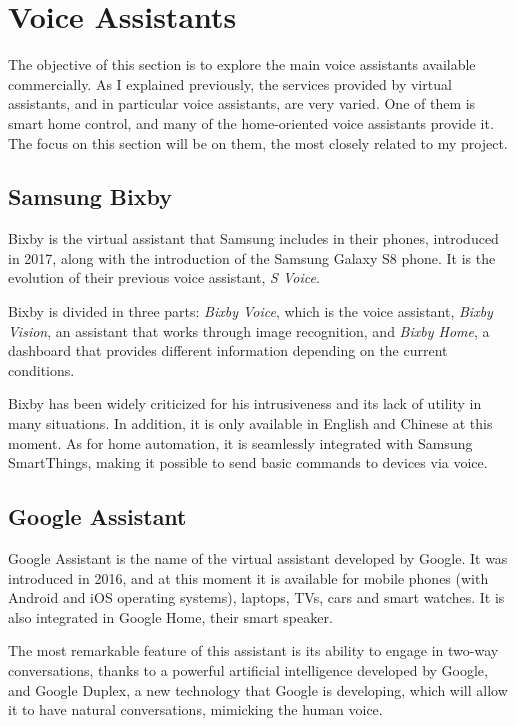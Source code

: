 %
%
%
%
%
%
%
%
%
%
%
%
%

\section{Voice Assistants}
The objective of this section is to explore the main voice assistants available commercially. As I explained previously, the services
provided by virtual assistants, and in particular voice assistants, are very varied. One of them is smart home control, and many of
the home-oriented voice assistants provide it. The focus on this section will be on them, the most closely related to my project.

\subsection{Samsung Bixby}
Bixby is the virtual assistant that Samsung includes in their phones, introduced in 2017, along with the introduction of the Samsung
Galaxy S8 phone. It is the evolution of their previous voice assistant, \textit{S Voice}.

Bixby is divided in three parts: \textit{Bixby Voice}, which is the voice assistant, \textit{Bixby Vision}, an assistant that works through
image recognition, and \textit{Bixby Home}, a dashboard that provides different information depending on the current
conditions.\cite{samsungBixby}

Bixby has been widely criticized for his intrusiveness and its lack of utility in many situations. In addition, it is only available in English
and Chinese at this moment. As for home automation, it is seamlessly integrated with Samsung SmartThings, making it possible to send
basic commands to devices via voice.

\subsection{Google Assistant}
Google Assistant is the name of the virtual assistant developed by Google. It was introduced in 2016, and at this moment it is
available for mobile phones (with Android and iOS operating systems), laptops, TVs, cars and smart watches. It is also integrated in
Google Home, their smart speaker.\cite{googleAssistant}

The most remarkable feature of this assistant is its ability to engage in two-way conversations, thanks to a powerful artificial intelligence
developed by Google, and Google Duplex, a new technology that Google is developing, which will allow it to have natural conversations,
mimicking the human voice.

